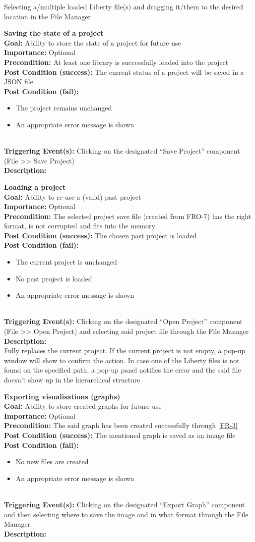 \documentclass[10pt,a4paper]{report}
\newcommand{\FRODescription}[8]{
    \textbf{#1} \leavevmode \\
    \textbf{Goal: } #2 \leavevmode \\
    \textbf{Importance: } #3 \leavevmode \\
    \textbf{Precondition: } #4 \leavevmode \\
    \textbf{Post Condition (success): } #5 \leavevmode \\
    \textbf{Post Condition (fail): } #6 \leavevmode \\
    \textbf{Triggering Event(s): } #7 \leavevmode \\
    \textbf{Description: } \leavevmode \\
    #8}
\begin{document}
\begin{FRO}
{\begin{itemize}
    \end{itemize}}
    {Selecting a/multiple loaded Liberty file(s) and dragging it/them to the desired location in the File Manager}
    \item \FRODescription{Saving the state of a project}
    {Ability to store the state of a project for future use}
    {Optional}
    {At least one library is successfully loaded into the project}
    {The current status of a project will be saved in a JSON file}
    {\begin{itemize}
        \item The project remains unchanged
        \item An appropriate error message is shown
    \end{itemize}}
    {Clicking on the designated “Save Project” component (File >> Save Project)}
    \item \FRODescription{Loading a project}
    {Ability to re-use a (valid) past project}
    {Optional}
    {The selected project save file (created from FRO-7) has the right format, is not corrupted and fits into the memory}
    {The chosen past project is loaded}
    {\begin{itemize}
        \item The current project is unchanged
        \item No past project is loaded
        \item An appropriate error message is shown
    \end{itemize}}
    {Clicking on the designated “Open Project” component (File >> Open Project) and selecting said project file through the File Manager}
    {Fully replaces the current project. If the current project is not empty, a pop-up window will show to confirm the action. In case one of the Liberty files is not found on the specified path, a pop-up panel notifies the error and the said file doesn’t show up in the hierarchical structure.}
    \item \FRODescription{Exporting visualisations (graphs)}
    {Ability to store created graphs for future use}
    {Optional}
    {The said graph has been created successfully through \ref{FR-3}}
    {The mentioned graph is saved as an image file}
    {\begin{itemize}
        \item No new files are created
        \item An appropriate error message is shown
    \end{itemize}}
    {Clicking on the designated “Export Graph” component and then selecting where to save the image and in what format through the File Manager}

\end{FRO}
\end{document}
